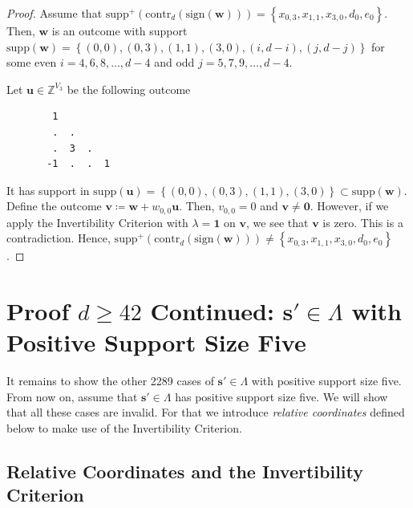 \begin{proof}
    Assume that \( \mathrm{supp}^+(\mathrm{contr}_d(\mathrm{sign}(\mathbf{w}))) = \left\{ x_{0,3}, x_{1,1}, x_{3,0}, d_0, e_0 \right\} \).
    Then, \( \mathbf{w} \) is an outcome with support \(  \mathrm{supp}(\mathbf{w}) = \left\{ (0,0), (0,3), (1,1), (3,0), (i,d-i), (j, d-j) \right\} \)
    for some even \( i =4,6,8, \dots, d-4 \) and odd \( j = 5,7,9, \dots, d-4 \).

    Let \( \mathbf{u} \in \mathbb{Z}^{V_3} \) be the following outcome 
    \begin{verbatim}
        1
        .  .
        .  3  .
       -1  .  .  1
    \end{verbatim}
    It has support in \( \mathrm{supp}(\mathbf{u}) = \left\{ (0,0), (0,3), (1,1), (3,0) \right\}  \subset  \mathrm{supp}(\mathbf{w})\). Define the outcome \( \mathbf{v} \coloneqq \mathbf{w} +w_{0,0} \mathbf{u} \). Then, \( v_{0,0} = 0 \) and \( \mathbf{v} \neq \mathbf{0} \). However, if we apply the Invertibility Criterion with \( \lambda = \mathbf{1} \) on \( \mathbf{v} \), we see that \( \mathbf{v} \) is zero. This is a contradiction. Hence, \( \mathrm{supp}^+(\mathrm{contr}_d(\mathrm{sign}(\mathbf{w}))) \neq \left\{ x_{0,3}, x_{1,1}, x_{3,0}, d_0, e_0 \right\}  \).
\end{proof}

\section{Proof \( d \geq 42\) Continued: \( \mathbf{s}' \in \Lambda\) with Positive Support Size Five}

It remains to show the other 2289 cases of \( \mathbf{s}' \in \Lambda \) with positive support size five. From now on, assume that \( \mathbf{s}' \in \Lambda \) has positive support size five. We will show that all these cases are invalid. For that we introduce \emph{relative coordinates} defined below to make use of the Invertibility Criterion.

\subsection{Relative Coordinates and the Invertibility Criterion}

